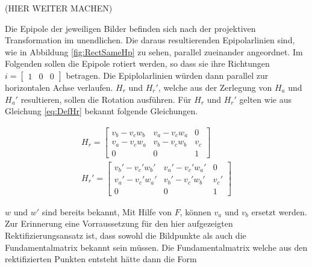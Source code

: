 (HIER WEITER MACHEN)


Die Epipole der jeweiligen Bilder befinden sich nach der projektiven Transformation im unendlichen. Die daraus resultierenden Epipolarlinien sind, wie in Abbildung \ref{fig:RectSameHp} zu sehen, parallel zueinander angeordnet. Im Folgenden sollen die Epipole rotiert werden, so dass sie ihre Richtungen $i = \begin{bmatrix}1&0&0\end{bmatrix}$ betragen. Die Epiplolarlinien würden dann parallel zur horizontalen Achse verlaufen\cite{ZZ}. $H_r$ und $H_r'$, welche aus der Zerlegung von $H_a$ und $H_a'$ resultieren, sollen die Rotation ausführen. Für $H_r$ und $H_r'$ gelten wie aus Gleichung \ref{eq:DefHr} bekannt folgende Gleichungen.




\begin{gather}
	H_r = 
	\begin{bmatrix}
		v_b-v_cw_b&	v_a-v_cw_a&0\\
		v_a-v_cw_a&v_b-v_cw_b&v_c\\
		0&0&1
	\end{bmatrix}\\
	H_r' = 
	\begin{bmatrix}
		v_b'-v_c'w_b'&	v_a'-v_c'w_a'&0\\
		v_a'-v_c'w_a'&v_b'-v_c'w_b'&v_c'\\
		0&0&1
	\end{bmatrix}
\end{gather}

$w$ und $w'$ sind bereits bekannt, Mit Hilfe von $F$, können $v_a$ und $v_b$ ersetzt werden. Zur Erinnerung eine Vorraussetzung für den hier aufgezeigten Rektifizierungsansatz ist, dass sowohl die Bildpunkte als auch die Fundamentalmatrix bekannt sein müssen. Die Fundamentalmatrix welche aus den rektifizierten Punkten entsteht hätte dann die Form 


